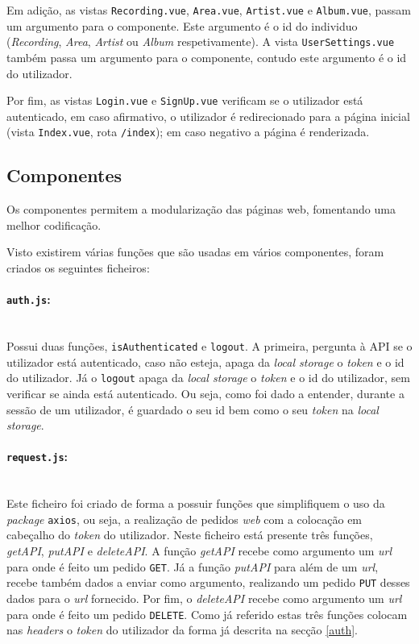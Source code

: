 \documentclass{article}
\begin{document}
Em adição, as vistas \texttt{Recording.vue}, \texttt{Area.vue}, \texttt{Artist.vue} e \texttt{Album.vue}, passam um argumento para o componente. Este argumento é o id do individuo (\textit{Recording}, \textit{Area}, \textit{Artist} ou \textit{Album} respetivamente). A vista \texttt{UserSettings.vue} também passa um argumento para o componente, contudo este argumento é o id do utilizador.

Por fim, as vistas \texttt{Login.vue} e \texttt{SignUp.vue} verificam se o utilizador está autenticado, em caso afirmativo, o utilizador é redirecionado para a página inicial (vista \texttt{Index.vue}, rota \texttt{/index}); em caso negativo a página é renderizada.

\subsection{Componentes}

Os componentes permitem a modularização das páginas web, fomentando uma melhor codificação.

Visto existirem várias funções que são usadas em vários componentes, foram criados os seguintes ficheiros:

\paragraph{\texttt{auth.js}:}\mbox{}\\

Possui duas funções, \texttt{isAuthenticated} e \texttt{logout}. A primeira, pergunta à API se o utilizador está autenticado, caso não esteja, apaga da \textit{local storage} o \textit{token} e o id do utilizador. Já o \texttt{logout} apaga da \textit{local storage} o \textit{token} e o id do utilizador, sem verificar se ainda está autenticado. Ou seja, como foi dado a entender, durante a sessão de um utilizador, é guardado o seu id bem como o seu \textit{token} na \textit{local storage}.

\paragraph{\texttt{request.js}:}\mbox{}\\

Este ficheiro foi criado de forma a possuir funções que simplifiquem o uso da \textit{package} \texttt{axios}, ou seja, a realização de pedidos \textit{web} com a colocação em cabeçalho do \textit{token} do utilizador. Neste ficheiro está presente três funções, \textit{getAPI}, \textit{putAPI} e \textit{deleteAPI}. A função \textit{getAPI} recebe como argumento um \textit{url} para onde é feito um pedido \texttt{GET}. Já a função \textit{putAPI} para além de um \textit{url}, recebe também dados a enviar como argumento, realizando um pedido \texttt{PUT} desses dados para o \textit{url} fornecido. Por fim, o \textit{deleteAPI} recebe como argumento um \textit{url} para onde é feito um pedido \texttt{DELETE}. Como já referido estas três funções colocam nas \textit{headers} o \textit{token} do utilizador da forma já descrita na secção \ref{auth}.
\end{document}
